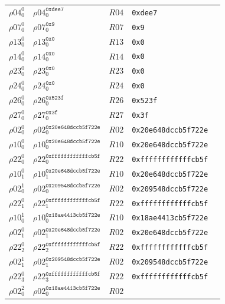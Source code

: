 \begin{longtable}[c]{|l|l|l|l|l|}
  $\rho04_{0}^{0}$ & $\rho04_{0}^{\texttt{0xdee7}}$ & $R04$ & \texttt{0xdee7} \\
  $\rho07_{0}^{0}$ & $\rho07_{0}^{\texttt{0x9}}$ & $R07$ & \texttt{0x9} \\
  $\rho13_{0}^{0}$ & $\rho13_{0}^{\texttt{0x0}}$ & $R13$ & \texttt{0x0} \\
  $\rho14_{0}^{0}$ & $\rho14_{0}^{\texttt{0x0}}$ & $R14$ & \texttt{0x0} \\
  $\rho23_{0}^{0}$ & $\rho23_{0}^{\texttt{0x0}}$ & $R23$ & \texttt{0x0} \\
  $\rho24_{0}^{0}$ & $\rho24_{0}^{\texttt{0x0}}$ & $R24$ & \texttt{0x0} \\
  $\rho26_{0}^{0}$ & $\rho26_{0}^{\texttt{0x523f}}$ & $R26$ & \texttt{0x523f} \\
  $\rho27_{0}^{0}$ & $\rho27_{0}^{\texttt{0x3f}}$ & $R27$ & \texttt{0x3f} \\
  $\rho02_{0}^{0}$ & $\rho02_{0}^{\texttt{0x20e648dccb5f722e}}$ & $R02$ &
  \texttt{0x20e648dccb5f722e} \\
  $\rho10_{0}^{0}$ & $\rho10_{0}^{\texttt{0x20e648dccb5f722e}}$ & $R10$ &
  \texttt{0x20e648dccb5f722e} \\
  $\rho22_{0}^{0}$ & $\rho22_{0}^{\texttt{0xffffffffffffcb5f}}$ & $R22$ &
  \texttt{0xffffffffffffcb5f} \\
  $\rho10_{1}^{0}$ & $\rho10_{1}^{\texttt{0x20e648dccb5f722e}}$ & $R10$ &
  \texttt{0x20e648dccb5f722e} \\
  $\rho02_{0}^{1}$ & $\rho02_{0}^{\texttt{0x209548dccb5f722e}}$ & $R02$ &
  \texttt{0x209548dccb5f722e} \\
  $\rho22_{1}^{0}$ & $\rho22_{1}^{\texttt{0xffffffffffffcb5f}}$ & $R22$ &
  \texttt{0xffffffffffffcb5f} \\
  $\rho10_{0}^{1}$ & $\rho10_{0}^{\texttt{0x18ae4413cb5f722e}}$ & $R10$ &
  \texttt{0x18ae4413cb5f722e} \\
  $\rho02_{1}^{0}$ & $\rho02_{1}^{\texttt{0x20e648dccb5f722e}}$ & $R02$ &
  \texttt{0x20e648dccb5f722e} \\
  $\rho22_{2}^{0}$ & $\rho22_{2}^{\texttt{0xffffffffffffcb5f}}$ & $R22$ &
  \texttt{0xffffffffffffcb5f} \\
  $\rho02_{1}^{1}$ & $\rho02_{1}^{\texttt{0x209548dccb5f722e}}$ & $R02$ &
  \texttt{0x209548dccb5f722e} \\
  $\rho22_{3}^{0}$ & $\rho22_{3}^{\texttt{0xffffffffffffcb5f}}$ & $R22$ &
  \texttt{0xffffffffffffcb5f} \\
  $\rho02_{0}^{2}$ & $\rho02_{0}^{\texttt{0x18ae4413cb5f722e}}$ & $R02$ &

\end{longtable}
